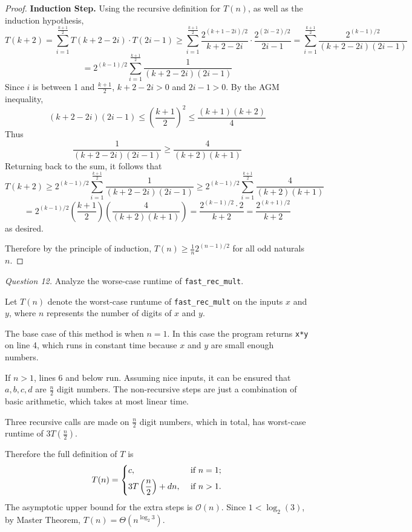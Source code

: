 \documentclass[11pt]{article}
\begin{document}
\begin{proof}
        \textbf{Induction Step.} Using the recursive definition for \(T(n)\), as well as the induction hypothesis,
        \[
            T(k+2) = \sum_{i=1}^{\frac{k+1}{2}} T(k+2-2i) \cdot T(2i - 1) \geq \sum_{i=1}^{\frac{k+1}{2}} \frac{2^{(k+1-2i) / 2}}{k+2-2i} \cdot \frac{2^{(2i-2) / 2}}{2i-1} = \sum_{i=1}^{\frac{k+1}{2}} \frac{2^{(k-1) / 2}}{(k+2-2i) (2i-1)}
        \]
        \[
            = 2^{(k-1) / 2}\sum_{i=1}^{\frac{k+1}{2}} \frac{1}{(k+2-2i) (2i-1)}
        \]
        Since \(i\) is between 1 and \(\frac{k+1}{2}\), \(k+2-2i >0\) and \(2i-1 >0\). By the AGM inequality,
        \[
            (k+2-2i)(2i-1)\leq \left(\frac{k+1}{2}\right)^2 \leq \frac{(k+1)(k+2)}{4}
        \]
        Thus
        \[
            \frac{1}{(k+2-2i) (2i-1)} \geq \frac{4}{(k+2)(k+1)}
        \]
        Returning back to the sum, it follows that
        \[
            T(k+2) \geq 2^{(k-1) / 2}\sum_{i=1}^{\frac{k+1}{2}} \frac{1}{(k+2-2i) (2i-1)} \geq 2^{(k-1) / 2}\sum_{i=1}^{\frac{k+1}{2}} \frac{4}{(k+2)(k+1)}
        \]
        \[
            = 2^{(k-1) / 2} \left( \frac{k+1}{2} \right) \left(\frac{4}{(k+2)(k+1)}\right) = \frac{2^{(k-1) / 2} \cdot 2}{k+2} = \frac{2^{(k+1) / 2}}{k+2}
        \]
        as desired.

        Therefore by the principle of induction, \(T(n) \geq \frac{1}{n}2^{(n-1) / 2}\) for all odd naturals \(n\).

    \end{proof}



    \textit{Question 12.} Analyze the worse-case runtime of \verb|fast_rec_mult|.

    Let \(T(n)\) denote the worst-case runtume of \verb|fast_rec_mult| on the inputs \(x\) and \(y\), where \(n\) represents the number of digits of \(x\) and \(y\).

    The base case of this method is when \(n=1\). In this case the program returns \verb|x*y| on line 4, which runs in constant time because \(x\) and \(y\) are small enough numbers.

    If \(n >1\), lines 6 and below run. Assuming nice inputs, it can be ensured that \(a,b,c,d\) are \(\frac{n}{2}\) digit numbers. The non-recursive steps are just a combination of basic arithmetic, which takes at most linear time.

    Three recursive calls are made on \(\frac{n}{2}\) digit numbers, which in total, has worst-case runtime of \(3T(\frac{n}{2})\).

    Therefore the full definition of \(T\) is
    \[
        T(n) = \begin{dcases}
            c, &\text{ if } n = 1 ;\\
            3T\left(\frac{n}{2}\right) + dn, &\text{ if } n >1 .
        \end{dcases}
    \]
    The asymptotic upper bound for the extra steps is \(\mathcal{O} (n)\). Since \(1 < \log _2(3)\), by Master Theorem, \(T(n) = \Theta (n^{\log _2 3})\).
\end{document}
